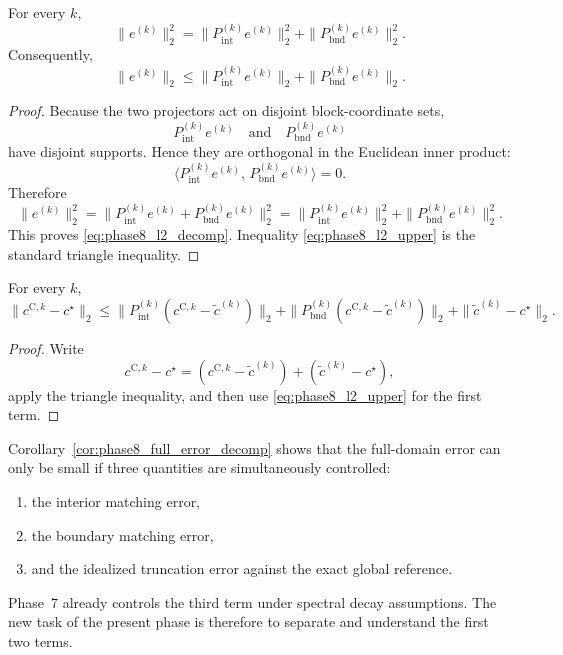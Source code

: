\begin{proposition}
\label{prop:phase8_interior_boundary_decomp}
For every \(k\),
\begin{equation}
\label{eq:phase8_l2_decomp}
\|e^{(k)}\|_2^2
=
\|P_{\mathrm{int}}^{(k)} e^{(k)}\|_2^2
+
\|P_{\mathrm{bnd}}^{(k)} e^{(k)}\|_2^2.
\end{equation}
Consequently,
\begin{equation}
\label{eq:phase8_l2_upper}
\|e^{(k)}\|_2
\le
\|P_{\mathrm{int}}^{(k)} e^{(k)}\|_2
+
\|P_{\mathrm{bnd}}^{(k)} e^{(k)}\|_2.
\end{equation}
\end{proposition}

\begin{proof}
Because the two projectors act on disjoint block-coordinate sets,
\[
P_{\mathrm{int}}^{(k)} e^{(k)}
\quad\text{and}\quad
P_{\mathrm{bnd}}^{(k)} e^{(k)}
\]
have disjoint supports.
Hence they are orthogonal in the Euclidean inner product:
\[
\langle P_{\mathrm{int}}^{(k)} e^{(k)},\, P_{\mathrm{bnd}}^{(k)} e^{(k)} \rangle = 0.
\]
Therefore
\[
\|e^{(k)}\|_2^2
=
\|P_{\mathrm{int}}^{(k)} e^{(k)} + P_{\mathrm{bnd}}^{(k)} e^{(k)}\|_2^2
=
\|P_{\mathrm{int}}^{(k)} e^{(k)}\|_2^2
+
\|P_{\mathrm{bnd}}^{(k)} e^{(k)}\|_2^2.
\]
This proves \eqref{eq:phase8_l2_decomp}. Inequality \eqref{eq:phase8_l2_upper} is the standard triangle inequality.
\end{proof}

\begin{corollary}
\label{cor:phase8_full_error_decomp}
For every \(k\),
\begin{equation}
\label{eq:phase8_full_error_decomp}
\|c^{\mathrm{C},k}-c^\star\|_2
\le
\|P_{\mathrm{int}}^{(k)}(c^{\mathrm{C},k}-\tilde c^{(k)})\|_2
+
\|P_{\mathrm{bnd}}^{(k)}(c^{\mathrm{C},k}-\tilde c^{(k)})\|_2
+
\|\tilde c^{(k)}-c^\star\|_2.
\end{equation}
\end{corollary}

\begin{proof}
Write
\[
c^{\mathrm{C},k}-c^\star
=
(c^{\mathrm{C},k}-\tilde c^{(k)})+(\tilde c^{(k)}-c^\star),
\]
apply the triangle inequality, and then use \eqref{eq:phase8_l2_upper} for the first term.
\end{proof}

\begin{remark}
\label{rem:phase8_consequence_of_decomp}
Corollary~\ref{cor:phase8_full_error_decomp} shows that the full-domain error can only be small if three quantities are simultaneously controlled:
\begin{enumerate}
    \item the interior matching error,
    \item the boundary matching error,
    \item and the idealized truncation error against the exact global reference.
\end{enumerate}
Phase~7 already controls the third term under spectral decay assumptions.
The new task of the present phase is therefore to separate and understand the first two terms.
\end{remark}

